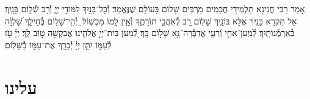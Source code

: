 \documentclass[twoside, openany, parskip=half, 11pt]{book}
\begin{document}
{\vspace{-.3\baselineskip}
אָמַר רַבִּי חֲנִינָא׃ תַּלְמִידֵי חֲכָמִים מַרְבִּים שָׁלוֹם בָּעוֹלָם שֶׁנֶּאֱמַר׃ וְ֯כׇל־בָּנַ֖יִךְ לִמּוּדֵ֣י יְיָ֑ וְ֯רַ֖ב שְׁ֯ל֥וֹם בָּנָֽיִךְ׃ אַל תִּקְרָא בָּנַֽיִךְ אֶלָּא בּוֹנַֽיִךְ שָׁל֣וֹם רָ֭ב לְ֯אֹֽהֲבֵ֣י תוֹרָתֶ֑ךָ וְ֯אֵ֖ין לָ֣מוֹ מִכְשֽׁוֹל׃  ֖ יְ֯הִֽי־שָׁל֥וֹם בְּ֯חֵילֵ֑ךְ שַׁ֝לְוָ֗ה בְּ֯אַרְמְ֯נוֹתָֽיִךְ׃ לְ֯מַֽעַן־אַחַ֥י וְ֯רֵעָ֑י אֲדַבְּ֯רָה־נָּ֖א שָׁל֣וֹם בָּֽךְ׃ לְ֭֯מַעַן בֵּית־יְיָ֣ אֱלֹהֵ֑ינוּ אֲבַקְשָׁ֖ה ט֣וֹב לָֽךְ׃ יְיָ֗ עֹ֖ז לְ֯עַמּ֣וֹ יִתֵּ֑ן יְיָ֓ יְ֯בָרֵ֖ךְ אֶת־עַמּ֣וֹ בַ֯שָּׁלֽוֹם׃

\rabbiskaddish

\section*{ עלינו }

\aleinu
}

\siyyumshabbatYT

\vspace{-1\baselineskip}
\end{document}
